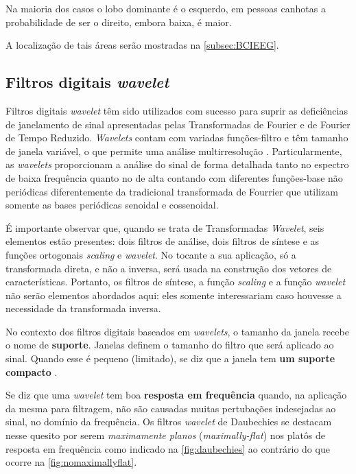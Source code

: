 			\par Na maioria dos casos o lobo dominante é o esquerdo, em pessoas canhotas a probabilidade de ser o direito, embora baixa, é maior.
			\par A localização de tais áreas serão mostradas na \autoref{subsec:BCIEEG}.
	
		\subsection{Filtros digitais \textit{wavelet}}
			\par Filtros digitais \textit{wavelet} têm sido utilizados com sucesso para suprir as deficiências de janelamento de sinal apresentadas pelas Transformadas de Fourier e de Fourier de Tempo Reduzido. \textit{Wavelets} contam com variadas funções-filtro e têm tamanho de janela variável, o que permite uma análise multirresolução \cite{Rod5254905}. Particularmente, as \textit{wavelets} proporcionam a análise do sinal de forma detalhada tanto no espectro de baixa frequência quanto no de alta contando com diferentes funções-base não periódicas diferentemente da tradicional transformada de Fourrier que utilizam somente as bases periódicas senoidal e cossenoidal.
			
			\par É importante observar que, quando se trata de Transformadas \textit{Wavelet}, seis elementos estão presentes: dois filtros de análise, dois filtros de síntese e as funções ortogonais \textit{scaling} e \textit{wavelet}. No tocante a sua aplicação, só a transformada direta, e não a inversa, será usada na construção dos vetores de características. Portanto, os filtros de síntese, a função \textit{scaling} e a função \textit{wavelet} não serão elementos abordados aqui: eles somente interessariam caso houvesse a necessidade da transformada inversa.
			
			\par No contexto dos filtros digitais baseados em \textit{wavelets}, o tamanho da janela recebe o nome de \textbf{suporte}. Janelas definem o tamanho do filtro que será aplicado ao sinal. Quando esse é pequeno (limitado), se diz que a janela tem \textbf{um suporte compacto} \cite{robi2003}.
			
			\par Se diz que uma \textit{wavelet} tem boa \textbf{resposta em frequência} quando, na aplicação da mesma para filtragem, não são causadas muitas pertubações indesejadas ao sinal, no domínio da frequência. Os filtros \textit{wavelet} de Daubechies \cite{daubechies1992ten} se destacam nesse quesito por serem \textit{maximamente planos} (\textit{maximally-flat}) \cite{butterworth1930} \cite{bianchi2007electronic} nos platôs de resposta em frequência como indicado na  \autoref{fig:daubechies} ao contrário do que ocorre na  \autoref{fig:nomaximallyflat}.
			
